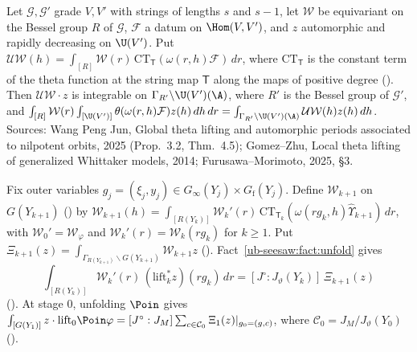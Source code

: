 \begin{fact}\label{ub-seesaw:fact:unfold}
Let $\mathcal G,\mathcal G'$ grade $V,V'$ with strings of lengths $s$ and $s-1$, let $\mathcal W$ be equivariant on the Bessel
group $R$ of $\mathcal G$, $\mathcal F$ a datum on $\Hom(V,V')$, and $z$ automorphic and rapidly decreasing on
$\U(V')$. Put $\mathcal U \mathcal W(h)=\int_{[R]}\mathcal W(r)\,\mathrm{CT}_{\mathsf T}(\omega(r,h)\mathcal F)\,dr$, where
$\mathrm{CT}_{\mathsf T}$ is the constant term of the theta function at the string map $\mathsf T$ along the maps of
positive degree (). Then $\mathcal U\mathcal W\cdot z$ is integrable on
$\Gamma_{R'}\backslash\U(V')(\A)$, where $R'$ is the Bessel group of $\mathcal G'$, and
$\int_{[R]}\mathcal W(r)\int_{[\U(V')]}\theta(\omega(r,h)\mathcal F)z(h)\,dh\,dr
=\int_{\Gamma_{R'}\backslash\U(V')(\A)}\mathcal U\mathcal W(h)z(h)\,dh$.
Sources: Wang Peng Jun, Global theta lifting and automorphic periods associated to nilpotent orbits,
2025 (Prop.~3.2, Thm.~4.5); Gomez--Zhu, Local theta lifting of generalized Whittaker models, 2014;
Furusawa--Morimoto, 2025, \S3.
\end{fact}

Fix outer variables $g_j=(\xi_j,y_j)\in G_\infty(Y_j)\times G_{\mathrm f}(Y_j)$. Define $\mathcal W_{k+1}$ on
$G(Y_{k+1})$ () by
$\mathcal W_{k+1}(h)=\int_{[R(Y_k)]}\mathcal W_k'(r)\,\mathrm{CT}_{\mathsf T_k}(\omega(rg_k,h)\widehat\Upsilon_{k+1})\,dr$,
with $\mathcal W_0'=\mathcal W_\varphi$ and $\mathcal W_k'(r)=\mathcal W_k(rg_k)$ for $k\ge1$. Put
$\Xi_{k+1}(z)=\int_{\Gamma_{R(Y_{k+1})}\backslash G(Y_{k+1})}\mathcal W_{k+1}z$
(). Fact~\ref{ub-seesaw:fact:unfold} gives
\begin{equation}\label{ub-seesaw:eq:step}
  \int_{[R(Y_k)]}\mathcal W_k'(r)\,(\mathrm{lift}_k^*z)(rg_k)\,dr=[J^\circ:J_\vartheta(Y_k)]\,\Xi_{k+1}(z)
\end{equation}
(). At stage $0$, unfolding $\Poin$ gives
$\int_{[G(Y_1)]}z\cdot\mathrm{lift}_0\Poin\varphi=[J^\circ:J_M]\sum_{c\in\mathcal C_0}\Xi_1(z)|_{g_0=(g,c)}$,
where $\mathcal C_0=J_M/J_\vartheta(Y_0)$ ().

